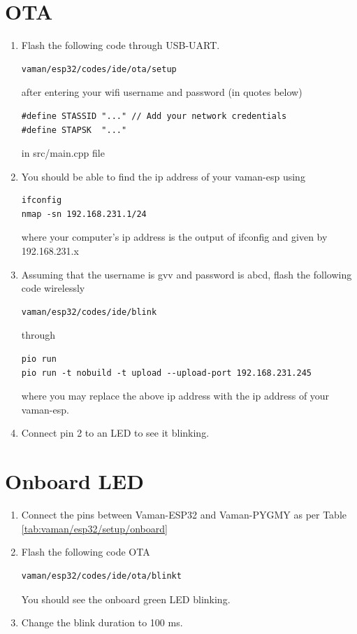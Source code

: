 \documentclass[journal,12pt,twocolumn]{IEEEtran}
\renewcommand\thesection{\arabic{section}}
\begin{document}
\section{OTA}
\renewcommand{\theequation}{\theenumi}
\renewcommand{\thefigure}{\theenumi}
\begin{enumerate}[label=\thesection.\arabic*.,ref=\thesection.\theenumi]
\item Flash the following code through USB-UART.  
\begin{lstlisting}
vaman/esp32/codes/ide/ota/setup
\end{lstlisting}
		after entering your wifi username and password (in quotes below)
\begin{lstlisting}
#define STASSID "..." // Add your network credentials
#define STAPSK  "..."
\end{lstlisting}
in src/main.cpp file
\item You should be able to find the ip address of your vaman-esp using 
\begin{lstlisting}
ifconfig
nmap -sn 192.168.231.1/24
\end{lstlisting}
where your computer's ip address is the output of ifconfig and given by 192.168.231.x
\item Assuming that the username is gvv and password is abcd, flash the following code wirelessly
\begin{lstlisting}
vaman/esp32/codes/ide/blink
\end{lstlisting}
through 
\begin{lstlisting}
pio run 
pio run -t nobuild -t upload --upload-port 192.168.231.245
\end{lstlisting}
where you may replace the above ip address with the ip address of your vaman-esp.
\item Connect pin 2 to an LED  to see it blinking.
\end{enumerate}
\section{Onboard LED}
\renewcommand{\theequation}{\theenumi}
\renewcommand{\thefigure}{\theenumi}
\begin{enumerate}[label=\thesection.\arabic*.,ref=\thesection.\theenumi]
\item Connect the pins between Vaman-ESP32 and Vaman-PYGMY as per Table \ref{tab:vaman/esp32/setup/onboard}
\begin{table}[h]
\centering

\caption{}
\label{tab:vaman/esp32/setup/onboard}
\end{table}
\item Flash the following code OTA
\begin{lstlisting}
vaman/esp32/codes/ide/ota/blinkt
\end{lstlisting}
You should see the onboard green LED blinking.
\item Change the blink duration to 100 ms.
\end{enumerate}
\end{document}
